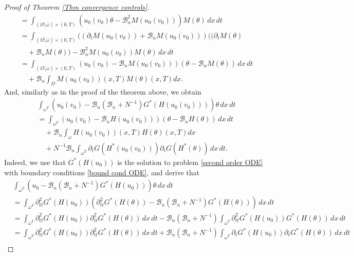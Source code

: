 \documentclass[reqno]{amsart}
\begin{document}
\begin{proof}[Proof of Theorem \ref{Thm convergence controls}]
\begin{equation}
\begin{aligned}
&=\int _{(\Omega \setminus \overline{\omega })\times
(0,T)}(u_0(v_0)\theta -\mathcal{B}_n^2M(u_0(v_0)))M(\theta ){\,dx\,dt%
}    \\
&=\int _{(\Omega \setminus \overline{\omega })\times (0,T)}((\partial
_{t}M(u_0(v_0))+\mathcal{B}_nM(u_0(v_0)))((\partial _{t}M(\theta )
  \\
&\quad +\mathcal{B}_nM(\theta ))-\mathcal{B}_n^2M(u_0(v_0))M(\theta ){\,dx\,dt%
}    \\
&=\int _{(\Omega \setminus \overline{\omega })\times
(0,T)}(u_0(v_0)-\mathcal{B}_nM(u_0(v_0)))(\theta -\mathcal{B}%
_nM(\theta ))\,dx\,dt    \\
&\quad +\mathcal{B}_n\int _{\Omega }M(u_0(v_0))(x,T)M(\theta )(x,T){dx}.
\end{aligned} \label{theta and u rel 2}
\end{equation}
And, similarly as in the proof of the theorem above, we obtain
\begin{align*}
&\int _{\omega ^{T}}(u_0(v_0)-\mathcal{B}_n(\mathcal{B}%
_n+N^{-1})G^{\ast }(H(u_0(v_0))))\theta \,dx\,dt \\
&=\int _{\omega ^{T}}(u_0(v_0)-\mathcal{B}_nH(u_0(v_0)))(%
\theta -\mathcal{B}_nH(\theta ))\,dx\,dt \\
&\quad +\mathcal{B}_n\int _{\omega }H(u_0(v_0))(x,T)H(\theta )(x,T){dx}
\\
&\quad +N^{-1}\mathcal{B}_n\int _{\omega ^{T}}\partial _{t}G(H^{\ast
}(u_0(v_0)))\partial _{t}G(H^{\ast }(\theta ))\,dx\,dt.
\end{align*}
Indeed, we use that $G^{\ast }(H(u_0))$ is the solution to  problem
\eqref{second order ODE} with boundary conditions \eqref{bound cond ODE},
and derive that
\begin{align*}
&\int _{\omega ^{T}}(u_0-\mathcal{B}_n(\mathcal{B}%
_n+N^{-1})G^{\ast }(H(u_0)))\theta\,dx\,dt \\
&=\int _{\omega ^{T}}\partial _{tt}^2G^{\ast }(H(u_0))(\partial
_{tt}^2G^{\ast }(H(\theta))-\mathcal{B}_n(\mathcal{B}_n+N^{-1})G^{\ast
}(H(\theta)))\,dx\,dt \\
&=\int _{\omega ^{T}}\partial _{tt}^2G^{\ast }(H(u_0))
\partial_{tt}^2G^{\ast }(H(\theta))\,dx\,dt - \mathcal{B}_n(\mathcal{B}%
_n+N^{-1})\int _{\omega ^{T}}\partial _{tt}^2G^{\ast
}(H(u_0))G^{\ast }(H(\theta))\,dx\,dt \\
&=\int _{\omega ^{T}}\partial _{tt}^2G^{\ast }(H(u_0))
\partial_{tt}^2G^{\ast }(H(\theta))\,dx\,dt + \mathcal{B}_n(\mathcal{B}%
_n+N^{-1})\int _{\omega ^{T}}\partial _{t}G^{\ast
}(H(u_0))\partial _{t}G^{\ast }(H(\theta))\,dx\,dt \\

\end{align*}
\end{proof}
\end{document}
